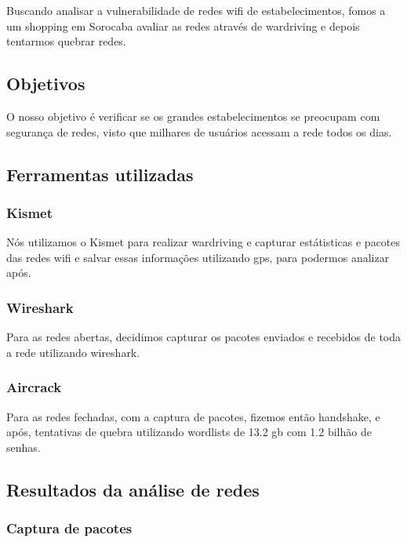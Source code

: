 \documentclass[
	article,			%
	12pt,				%
	oneside,			%
	a4paper,			%
	english,			%
	brazil,				%
	sumario=tradicional
	]{abntex2}
\begin{document}
Buscando analisar a vulnerabilidade de redes wifi de estabelecimentos, fomos a um shopping em Sorocaba avaliar as redes através de wardriving e depois tentarmos quebrar redes.

\subsection{Objetivos}

O nosso objetivo é verificar se os grandes estabelecimentos se preocupam com segurança de redes, visto que milhares de usuários acessam a rede todos os dias.

\subsection{Ferramentas utilizadas}

\subsubsection{Kismet}

Nós utilizamos o Kismet para realizar wardriving e capturar estátisticas e pacotes das redes wifi e salvar essas informações utilizando gps, para podermos analizar após.

\subsubsection{Wireshark}

Para as redes abertas, decidimos capturar os pacotes enviados e recebidos de toda a rede utilizando wireshark.

\subsubsection{Aircrack}

Para as redes fechadas, com a captura de pacotes, fizemos então handshake, e após, tentativas de quebra utilizando wordlists de 13.2 gb com 1.2 bilhão de senhas.

\subsection{Resultados da análise de redes}

\subsubsection{Captura de pacotes}
\end{document}
